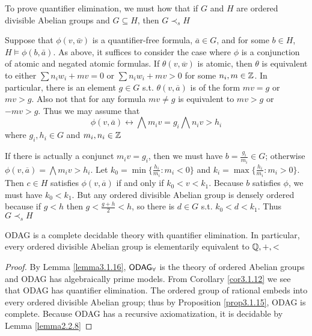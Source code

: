 \documentclass[11pt]{article}
\begin{document}
To prove quantifier elimination, we must how that if \(G\) and \(H\) are
ordered divisible Abelian groups and \(G\subseteq H\), then \(G\prec_s H\)

Suppose that \(\phi(v,\bar{w})\) is a quantifier-free formula,
\(\overbar{a}\in G\), and for some \(b\in H\), \(H\vDash\phi(b,\bar{a})\).
As above, it suffices to consider the case where \(\phi\) is a conjunction of
atomic and negated atomic formulas. If \(\theta(v,\overbar{w})\) is atomic,
then \(\theta\) is equivalent to either \(\sum n_iw_i+mv=0\) or
\(\sum n_iw_i+mv>0\) for some \(n_i,m\in\mathbb{Z}\). In particular, there is an
element \(g\in G\) s.t. \(\theta(v,\overbar{a})\) is of the form \(mv=g\) or
\(mv>g\). Also not that for any formula \(mv\neq g\) is equivalent to
\(mv>g\) or \(-mv>g\). Thus we may assume that
\begin{equation*}
\phi(v,\overbar{a})\leftrightarrow\bigwedge m_iv=g_i
\bigwedge n_iv>h_i
\end{equation*}
where \(g_i,h_i\in G\) and \(m_i,n_i\in\mathbb{Z}\)

If there is actually a conjunct \(m_iv=g_i\), then we must have
\(b=\frac{g_i}{m_i}\in G\); otherwise
\(\phi(v,\overbar{a})=\bigwedge m_iv>h_i\). Let
\(k_0=\min\{\frac{h_i}{m_i}:m_i<0\}\) and
\(k_i=\max\{\frac{h_i}{m_i}:m_i>0\}\). Then \(c\in H\) satisfies
\(\phi(v,\overbar{a})\) if and only if \(k_0<v<k_1\). Because \(b\)
satisfies \(\phi\), we must have \(k_0<k_1\). But any ordered divisible Abelian
group is densely ordered because if \(g<h\) then \(g<\frac{g+h}{2}<h\), so
there is \(d\in G\) s.t. \(k_0<d<k_1\). Thus \(G\prec_s H\)

\begin{corollary}[]
\label{cor3.1.17}
ODAG is a complete decidable theory with quantifier elimination. In
particular, every ordered divisible Abelian group is elementarily equivalent
to \(\mathbb{Q},+,<\)
\end{corollary}

\begin{proof}
By Lemma \ref{lemma3.1.16}, \(\operatorname{\textsf{ODAG}}_\forall\) is the theory of ordered Abelian
groups and ODAG has algebraically prime models. From Corollary \ref{cor3.1.12}
we see that ODAG has quantifier elimination. The ordered group of rational
embeds into every ordered divisible Abelian group; thus by Proposition
\ref{prop3.1.15}, ODAG is complete. Because ODAG has a recursive
axiomatization, it is decidable by Lemma \ref{lemma2.2.8}
\end{proof}
\end{document}
